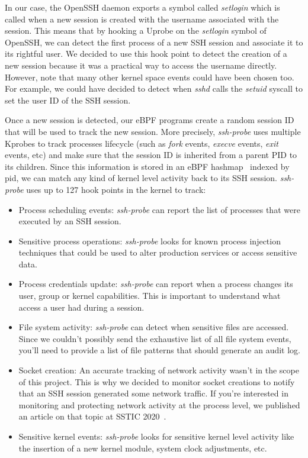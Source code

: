 In our case, the OpenSSH daemon exports a symbol called \emph{setlogin} which is called when a new session is created with the username associated with the session.
This means that by hooking a Uprobe on the \emph{setlogin} symbol of OpenSSH, we can detect the first process of a new SSH session and associate it to its rightful user.
We decided to use this hook point to detect the creation of a new session because it was a practical way to access the username directly.
However, note that many other kernel space events could have been chosen too.
For example, we could have decided to detect when \emph{sshd} calls the \emph{setuid} syscall to set the user ID of the SSH session.

Once a new session is detected, our eBPF programs create a random session ID that will be used to track the new session.
More precisely, \emph{ssh-probe} uses multiple Kprobes to track processes lifecycle (such as \emph{fork} events, \emph{execve} events, \emph{exit} events, etc) and make sure that the session ID is inherited from a parent PID to its children.
Since this information is stored in an eBPF hashmap~\cite{MonitoringAndProtectingSSHSessionsWithEBPF:LorenzoDavid} indexed by pid, we can match any kind of kernel level activity back to its SSH session.
\emph{ssh-probe} uses up to 127 hook points in the kernel to track:

\begin{itemize}
  \item Process scheduling events: \emph{ssh-probe} can report the list of processes that were executed by an SSH session.
  \item Sensitive process operations: \emph{ssh-probe} looks for known process injection techniques that could be used to alter production services or access sensitive data.
  \item Process credentials update: \emph{ssh-probe} can report when a process changes its user, group or kernel capabilities.
  This is important to understand what access a user had during a session.
  \item File system activity: \emph{ssh-probe} can detect when sensitive files are accessed.
  Since we couldn’t possibly send the exhaustive list of all file system events, you’ll need to provide a list of file patterns that should generate an audit log.
  \item Socket creation: An accurate tracking of network activity wasn’t in the scope of this project.
  This is why we decided to monitor socket creations to notify that an SSH session generated some network traffic.
  If you’re interested in monitoring and protecting network activity at the process level, we published an article on that topic at SSTIC 2020~\cite{MonitoringAndProtectingSSHSessionsWithEBPF:NSP}.
  \item Sensitive kernel events: \emph{ssh-probe} looks for sensitive kernel level activity like the insertion of a new kernel module, system clock adjustments, etc.
\end{itemize}

